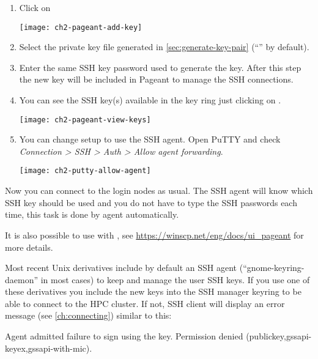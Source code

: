   \begin{enumerate}
  \item  Click on 
  \begin{center}
    \texttt{[image: ch2-pageant-add-key]}
  \end{center}
  \item  Select the private key file generated in \autoref{sec:generate-key-pair}
  (``'' by default).
  \item  Enter the same SSH key password used to generate the key. After this step the new key
  will be included in Pageant to manage the SSH connections.
  \item  You can see the SSH key(s) available in the key ring just clicking on .
  \begin{center}
    \texttt{[image: ch2-pageant-view-keys]}
  \end{center}
  \item  You can change  setup to use the SSH agent. Open PuTTY and check
  \emph{Connection >{} SSH >{} Auth >{} Allow agent forwarding}.
  \begin{center}
    \texttt{[image: ch2-putty-allow-agent]}
  \end{center}
  \end{enumerate}

  Now you can connect to the login nodes as usual. The SSH agent will know which SSH key should be used and you
  do not have to type the SSH passwords each time, this task is done by  agent automatically.
  
  It is also possible to use  with , see \url{https://winscp.net/eng/docs/ui_pageant}
  for more details.
  
\fi %

\ifmacORlinux
  Most recent Unix derivatives include by default an SSH agent
  \iflinux(``gnome-keyring-daemon'' in most cases) \fi to keep and manage the user SSH keys.
  If you use one of these derivatives you  include the new keys into
  the SSH manager keyring to be able to connect to the HPC cluster. If not,
  SSH client will display an error message (see \autoref{ch:connecting})
  similar to this:

  \begin{flattext}
   Agent admitted failure to sign using the key.
   Permission denied (publickey,gssapi-keyex,gssapi-with-mic).
  \end{flattext}

